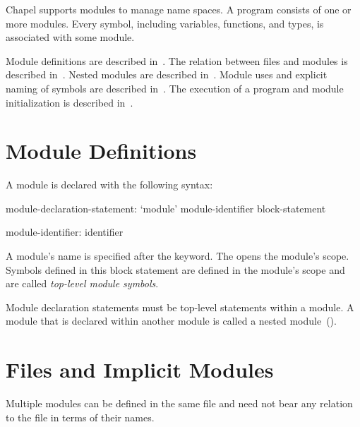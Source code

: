 \label{Modules}


Chapel supports modules to manage name spaces.  A program consists of
one or more modules.  Every symbol, including variables, functions,
and types, is associated with some module.

Module definitions are described in~.  The
relation between files and modules is described
in~.  Nested modules are described
in~.  Module uses and explicit naming of symbols
are described in~.  The execution of a program and
module initialization is described in~.

\section{Module Definitions}
\label{Module_Definitions}


A module is declared with the following syntax:
\begin{syntax}
module-declaration-statement:
  `module' module-identifier block-statement

module-identifier:
  identifier
\end{syntax}

A module's name is specified after the  keyword.
The  opens the module's scope.  Symbols defined
in this block statement are defined in the module's scope and are
called \emph{top-level module symbols}.

Module declaration statements must be top-level statements within a
module.  A module that is declared within another module is called a
nested module~().

\section{Files and Implicit Modules}
\label{Implicit_Modules}

Multiple modules can be defined in the same file and need not bear any
relation to the file in terms of their names.

